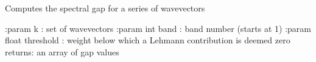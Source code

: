 \documentclass[letterpaper,10pt,english]{sphinxmanual}
\begin{document}

\begin{fulllineitems}
\label{\detokenize{spectral:pyqcm.spectral.gap}}
\sphinxAtStartPar
Computes the spectral gap for a series of wavevectors

\sphinxAtStartPar
:param k : set of wavevectors
:param int band : band number (starts at 1)
:param float threshold : weight below which a Lehmann contribution is deemed zero
returns: an array of gap values

\end{fulllineitems}

\end{document}
